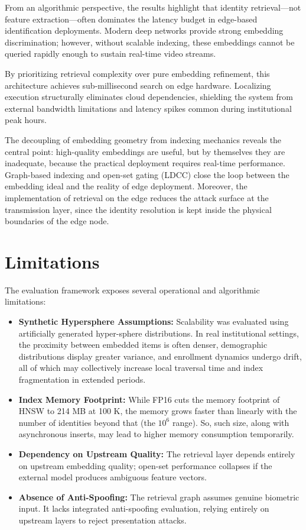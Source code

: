\documentclass[conference]{IEEEtran}
\begin{document}
From an algorithmic perspective, the results highlight that identity retrieval—not feature extraction—often dominates the latency budget in edge-based identification deployments. Modern deep networks provide strong embedding discrimination; however, without scalable indexing, these embeddings cannot be queried rapidly enough to sustain real-time video streams.

By prioritizing retrieval complexity over pure embedding refinement, this architecture achieves sub-millisecond search on edge hardware. Localizing execution structurally eliminates cloud dependencies, shielding the system from external bandwidth limitations and latency spikes common during institutional peak hours.

The decoupling of embedding geometry from indexing mechanics reveals the central point: high-quality embeddings are useful, but by themselves they are inadequate, because the practical deployment requires real-time performance. Graph-based indexing and open-set gating (LDCC) close the loop between the embedding ideal and the reality of edge deployment. Moreover, the implementation of retrieval on the edge reduces the attack surface at the transmission layer, since the identity resolution is kept inside the physical boundaries of the edge node.

\section{Limitations}

The evaluation framework exposes several operational and algorithmic limitations:
\begin{itemize}
    \item \textbf{Synthetic Hypersphere Assumptions:} Scalability was evaluated using artificially generated hyper-sphere distributions. In real institutional settings, the proximity between embedded items is often denser, demographic distributions display greater variance, and enrollment dynamics undergo drift, all of which may collectively increase local traversal time and index fragmentation in extended periods.
    \item \textbf{Index Memory Footprint:} While FP16 cuts the memory footprint of HNSW to 214 MB at 100 K, the memory grows faster than linearly with the number of identities beyond that (the $10^6$ range). So, such size, along with asynchronous inserts, may lead to higher memory consumption temporarily.
    \item \textbf{Dependency on Upstream Quality:} The retrieval layer depends entirely on upstream embedding quality; open-set performance collapses if the external model produces ambiguous feature vectors.
    \item \textbf{Absence of Anti-Spoofing:} The retrieval graph assumes genuine biometric input. It lacks integrated anti-spoofing evaluation, relying entirely on upstream layers to reject presentation attacks.
\end{itemize}
\end{document}
